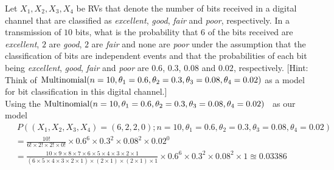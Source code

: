 \begin{ExerciseList}
\Exercise
Let $X_1,X_2,X_3,X_4$ be RVs that denote the number of bits received in a digital channel that are classified as {\em excellent}, {\em good}, {\em fair} and {\em poor}, respectively.  
In a transmission of $10$ bits, what is the probability that $6$ of the bits received are {\em excellent}, $2$ are {\em good}, $2$ are {\em fair} and none are {\em poor} under the assumption that the classification of bits are independent events and that the probabilities of each bit being {\em excellent}, {\em good}, {\em fair} and {\em poor} are $0.6$, $0.3$, $0.08$ and $0.02$, respectively. 
[Hint: Think of $\mbox{{\rm Multinomial}}(n=10,\theta_1=0.6,\theta_2=0.3,\theta_3=0.08,\theta_4=0.02)$ as a model for bit classification in this digital channel.]
\Answer
~\\
Using the $\mbox{{\rm Multinomial}}(n=10,\theta_1=0.6,\theta_2=0.3,\theta_3=0.08,\theta_4=0.02)$ \rv~as our model
\begin{align*}
&~ P\left( (X_1,X_2,X_3,X_4)=(6,2,2,0); n=10,\theta_1=0.6,\theta_2=0.3,\theta_3=0.08,\theta_4=0.02 \right)\\ 
&= \frac{10!}{6! \times 2! \times 2! \times 0!} \times 0.6^6 \times 0.3^2 \times 0.08^2 \times 0.02^0\\
&= \frac{10 \times 9 \times 8 \times 7 \times 6 \times 5 \times 4 \times 3 \times 2 \times 1}{(6 \times 5 \times 4 \times 3 \times 2 \times 1) \times (2 \times 1) \times (2 \times 1) \times 1} \times  0.6^6 \times 0.3^2 \times 0.08^2 \times 1 \approxeq 0.03386\\
\end{align*}


\end{ExerciseList}
\newpage
